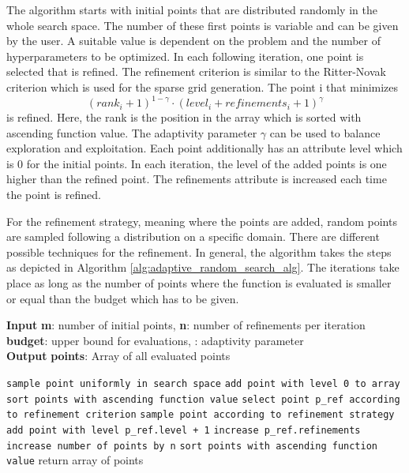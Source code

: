The algorithm starts with initial points that are distributed randomly in the whole search space. The number of these first points is variable and can be given by the user. A suitable value is dependent on the problem and the number of hyperparameters to be optimized. In each following iteration, one point is selected that is refined. The refinement criterion is similar to the Ritter-Novak criterion which is used for the sparse grid generation. The point i that minimizes 
\begin{equation}
\label{eq:refinement_criterion}
	(rank_i + 1)^{1-\gamma} \cdot (level_i + refinements_i + 1)^\gamma
\end{equation} 
is refined. Here, the rank is the position in the array which is sorted with ascending function value. The adaptivity parameter $ \gamma $ can be used to balance exploration and exploitation. Each point additionally has an attribute level which is 0 for the initial points. In each iteration, the level of the added points is one higher than the refined point. The refinements attribute is increased each time the point is refined. \newline

For the refinement strategy, meaning where the points are added, random points are sampled following a distribution on a specific domain. There are different possible techniques for the refinement. In general, the algorithm takes the steps as depicted in Algorithm \ref{alg:adaptive_random_search_alg}. The iterations take place as long as the number of points where the function is evaluated is smaller or equal than the budget which has to be given.

\begin{algorithm}[htbp!]
	\caption{  }
	\label{alg:adaptive_random_search_alg}
	\textbf{Input} \textbf{m}: number of initial points, \textbf{n}: number of refinements per iteration \textbf{budget}: upper bound for evaluations, \boldmath{ $ \gamma $}: adaptivity parameter\\
	\textbf{Output} \textbf{points}: Array of all evaluated points
	\begin{algorithmic}
			\State \texttt{sample point uniformly in search space}
			\State \texttt{add point with level 0 to array}
		\EndFor
		\State \texttt{sort points with ascending function value}
			\State \texttt{select point p\_ref according to refinement criterion}
				\State \texttt{sample point according to refinement strategy}
				\State \texttt{add point with level p\_ref.level + 1}
				\State \texttt{increase p\_ref.refinements}
			\EndFor
			\State \texttt{increase number of points by n}
			\State \texttt{sort points with ascending function value}
		\EndWhile
		\State return array of points
	\end{algorithmic}
\end{algorithm}

